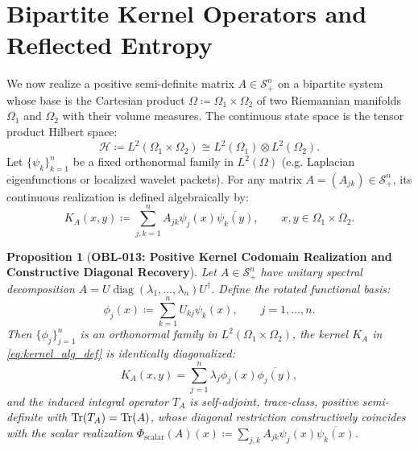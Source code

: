\documentclass[11pt,a4paper,reqno]{amsart}
\newtheorem{proposition}[theorem]{Proposition}
\theoremstyle{definition}
\theoremstyle{remark}
\numberwithin{equation}{section}
\begin{document}
\section{Bipartite Kernel Operators and Reflected Entropy}
\label{sec:bipartite}

We now realize a positive semi-definite matrix $A \in \mathcal{S}_+^n$ on a bipartite system whose base is the Cartesian product $\Omega \coloneqq \Omega_1 \times \Omega_2$ of two Riemannian manifolds $\Omega_1$ and $\Omega_2$ with their volume measures. The continuous state space is the tensor product Hilbert space:
\begin{equation}
\mathcal{H} \coloneqq L^2(\Omega_1 \times \Omega_2) \cong L^2(\Omega_1) \otimes L^2(\Omega_2).
\end{equation}
Let $\{\psi_k\}_{k=1}^n$ be a fixed orthonormal family in $L^2(\Omega)$ (e.g. Laplacian eigenfunctions or localized wavelet packets). For any matrix $A = (A_{jk}) \in \mathcal{S}_+^n$, its continuous realization is defined algebraically by:
\begin{equation}
\label{eq:kernel_alg_def}
K_A(x, y) \coloneqq \sum_{j, k=1}^n A_{jk} \psi_j(x) \overline{\psi_k(y)}, \qquad x, y \in \Omega_1 \times \Omega_2.
\end{equation}

\begin{proposition}[\textbf{OBL-013: Positive Kernel Codomain Realization and Constructive Diagonal Recovery}]
\label{prop:kernel_codomain_psd}
Let $A \in \mathcal{S}_+^n$ have unitary spectral decomposition $A = U \operatorname{diag}(\lambda_1, \dots, \lambda_n) U^\dagger$. Define the rotated functional basis:
\begin{equation}
\phi_j(x) \coloneqq \sum_{k=1}^n U_{kj} \psi_k(x), \qquad j = 1, \dots, n.
\end{equation}
Then $\{\phi_j\}_{j=1}^n$ is an orthonormal family in $L^2(\Omega_1 \times \Omega_2)$, the kernel $K_A$ in \eqref{eq:kernel_alg_def} is identically diagonalized:
\begin{equation}
K_A(x, y) = \sum_{j=1}^n \lambda_j \phi_j(x) \overline{\phi_j(y)},
\end{equation}
and the induced integral operator $T_A$ is self-adjoint, trace-class, positive semi-definite with $\Tr(T_A) = \Tr(A)$, whose diagonal restriction constructively coincides with the scalar realization $\Phi_{\mathrm{scalar}}(A)(x) \coloneqq \sum_{j,k} A_{jk} \psi_j(x) \overline{\psi_k(x)}$.
\end{proposition}
\end{document}
